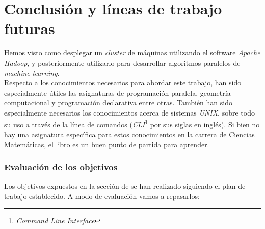 \chapter*{Conclusión y líneas de trabajo futuras}
Hemos visto como desplegar un \textit{cluster} de máquinas utilizando el software  \textit{Apache Hadoop}, 
y posteriormente utilizarlo para desarrollar algoritmos paralelos de \textit{machine learning}.\\
Respecto a los conocimientos necesarios para abordar este trabajo, han sido especialmente útiles las asignaturas
de programación paralela, geometría computacional y programación declarativa entre otras. También han sido especialmente
necesarios los conocimientos acerca de sistemas \textit{UNIX}, sobre todo su uso a través de la línea de comandos
(\textit{CLI}\footnote{\textit{Command Line Interface}} por sus siglas en inglés). Si bien no hay una asignatura
específica para estos conocimientos en la carrera de Ciencias Matemáticas, el libro \cite{unix_programming_environment}
es un buen punto de partida para aprender.

\subsection*{Evaluación de los objetivos}
Los objetivos expuestos en la sección de  se han realizado siguiendo el 
plan de trabajo establecido. A modo de evaluación vamos a repasarlos:


